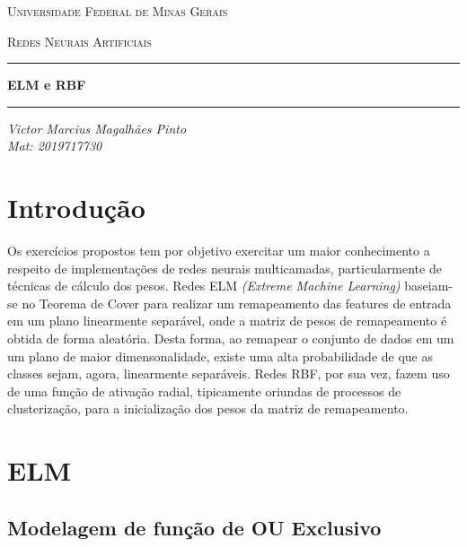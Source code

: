 \documentclass{article}
\begin{document}


\begin{center}

{\scshape\Large Universidade Federal de Minas Gerais \par}
{\scshape\large Redes Neurais Artificiais \par}
\vspace{5cm}

\hrule
\hfill

{\huge \textbf{ELM e RBF}\par}
\hfill
\hrule
\hfill

\vspace{3cm}

{\large\itshape Victor Marcius Magalhães Pinto\\Mat: 2019717730\par}

\vspace{2cm}

\end{center}

\newpage

\section{Introdução}

Os exercícios propostos tem por objetivo exercitar um maior conhecimento a respeito de implementações de redes neurais multicamadas, particularmente de técnicas de cálculo dos pesos. Redes ELM \textit{(Extreme Machine Learning)} baseiam-se no Teorema de Cover para realizar um remapeamento das features de entrada em um plano linearmente separável, onde a matriz de pesos de remapeamento é obtida de forma aleatória. Desta forma, ao remapear o  conjunto de dados em um um plano de maior dimensonalidade, existe uma alta probabilidade de que as classes sejam, agora, linearmente separáveis. Redes RBF, por sua vez, fazem uso de uma função de ativação radial, tipicamente oriundas de processos de clusterização, para a inicialização dos pesos da matriz de remapeamento.


\section{ELM}


\subsection{Modelagem de função de OU Exclusivo}
\end{document}
